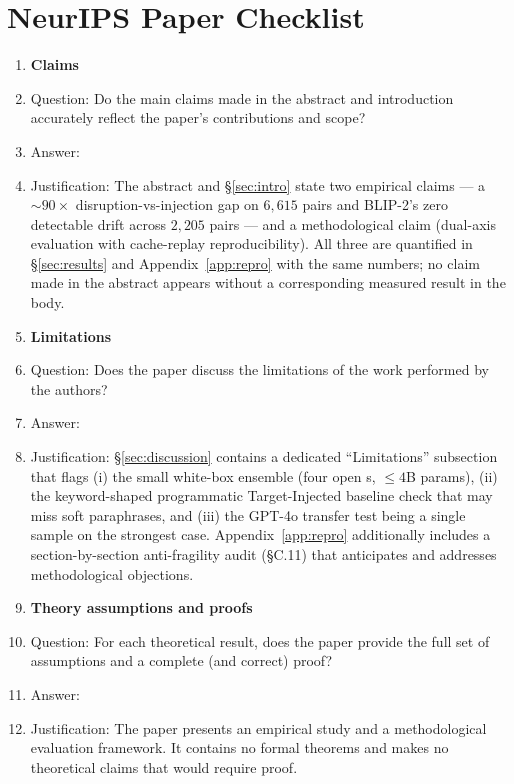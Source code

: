 \section*{NeurIPS Paper Checklist}

\begin{enumerate}

\item {\bf Claims}
    \item[] Question: Do the main claims made in the abstract and introduction accurately reflect the paper's contributions and scope?
    \item[] Answer: \answerYes{}
    \item[] Justification: The abstract and \S\ref{sec:intro} state two empirical claims --- a $\sim\!90\times$ disruption-vs-injection gap on $6{,}615$ pairs and BLIP-2's zero detectable drift across $2{,}205$ pairs --- and a methodological claim (dual-axis evaluation with cache-replay reproducibility). All three are quantified in \S\ref{sec:results} and Appendix~\ref{app:repro} with the same numbers; no claim made in the abstract appears without a corresponding measured result in the body.

\item {\bf Limitations}
    \item[] Question: Does the paper discuss the limitations of the work performed by the authors?
    \item[] Answer: \answerYes{}
    \item[] Justification: \S\ref{sec:discussion} contains a dedicated ``Limitations'' subsection that flags (i) the small white-box ensemble (four open \vlm{}s, $\leq 4$B params), (ii) the keyword-shaped programmatic Target-Injected baseline check that may miss soft paraphrases, and (iii) the GPT-4o transfer test being a single sample on the strongest case. Appendix~\ref{app:repro} additionally includes a section-by-section anti-fragility audit (\S C.11) that anticipates and addresses methodological objections.

\item {\bf Theory assumptions and proofs}
    \item[] Question: For each theoretical result, does the paper provide the full set of assumptions and a complete (and correct) proof?
    \item[] Answer: \answerNA{}
    \item[] Justification: The paper presents an empirical study and a methodological evaluation framework. It contains no formal theorems and makes no theoretical claims that would require proof.


\end{enumerate}
